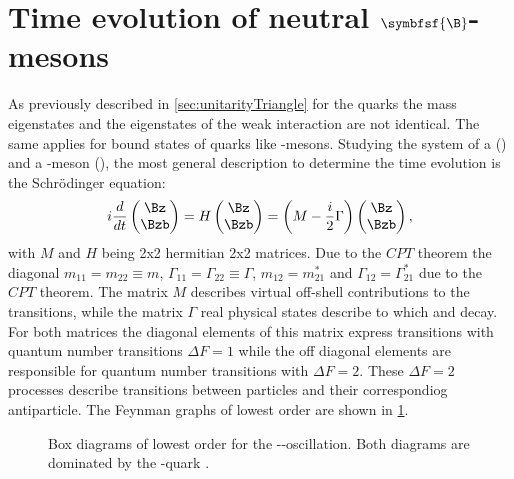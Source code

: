 \section[head={Time evolution of neutral \B-mesons},tocentry={Time evolution of neutral $\symbfsf{\B}$-mesons}]{Time evolution of neutral $\symbfsf{\B}$-mesons}
\label{sec:TimeEvolution}

As previously described in \cref{sec:unitarityTriangle} for the quarks the mass eigenstates and the eigenstates of the weak interaction are not identical.
The same applies for bound states of quarks like \B-mesons. Studying the system of a \Bz (\bquarkbar\dquark) and a \Bzb-meson
(\bquark\dquarkbar), the most general description to determine the time evolution is the Schrödinger equation:
\begin{equation}
i\frac{d}{dt}\begin{pmatrix} \Bz \\ \Bzb \end{pmatrix} = H \begin{pmatrix} \Bz \\ \Bzb \end{pmatrix}
=\left(M-\frac{i}{2}\Gamma\right)\begin{pmatrix} \Bz \\ \Bzb \end{pmatrix},
\end{equation}
with $M$ and $H$ being 2x2 hermitian 2x2 matrices.
Due to the $CPT$ theorem the diagonal  $m_{11}=m_{22}\equiv m$, $\Gamma_{11}=\Gamma_{22}\equiv\Gamma$, $m_{12}=m_{21}^\ast$ and $\Gamma_{12}=\Gamma_{21}^\ast$ due to the $CPT$ theorem.
The matrix $M$ describes virtual off-shell contributions to the transitions, while the matrix $\Gamma$ real physical states describe to which \Bz and \Bzb decay.
For both matrices the diagonal elements of this matrix express transitions with quantum number transitions $\Delta F=1$ while the off diagonal elements are responsible for quantum number transitions with $\Delta F=2$.
These $\Delta F=2$ processes describe transitions between particles and their correspondiog antiparticle.
The Feynman graphs of lowest order are shown in \cref{fig:FeynmanMixing}.
\begin{figure}[tbp]
	\centering
	
	\hspace{0.5cm}
	
	\caption{Box diagrams of lowest order for the \Bz-\Bzb-oscillation. Both diagrams are dominated by the \tquark-quark \cite{Ellis:2016jkw}.}
	\label{fig:FeynmanMixing}
\end{figure}
